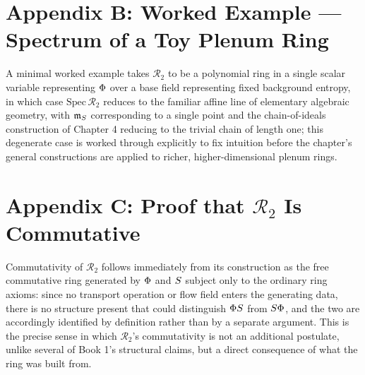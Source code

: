 \chapter*{Appendix B: Worked Example --- Spectrum of a Toy Plenum Ring}

A minimal worked example takes $\mathcal{R}_2$ to be a polynomial ring in a single scalar variable representing $\Phi$ over a base field representing fixed background entropy, in which case $\mathrm{Spec}\,\mathcal{R}_2$ reduces to the familiar affine line of elementary algebraic geometry, with $\mathfrak{m}_{S}$ corresponding to a single point and the chain-of-ideals construction of Chapter 4 reducing to the trivial chain of length one; this degenerate case is worked through explicitly to fix intuition before the chapter's general constructions are applied to richer, higher-dimensional plenum rings.

\chapter*{Appendix C: Proof that $\mathcal{R}_2$ Is Commutative}

Commutativity of $\mathcal{R}_2$ follows immediately from its construction as the free commutative ring generated by $\Phi$ and $S$ subject only to the ordinary ring axioms: since no transport operation or flow field enters the generating data, there is no structure present that could distinguish $\Phi S$ from $S \Phi$, and the two are accordingly identified by definition rather than by a separate argument. This is the precise sense in which $\mathcal{R}_2$'s commutativity is not an additional postulate, unlike several of Book 1's structural claims, but a direct consequence of what the ring was built from.

